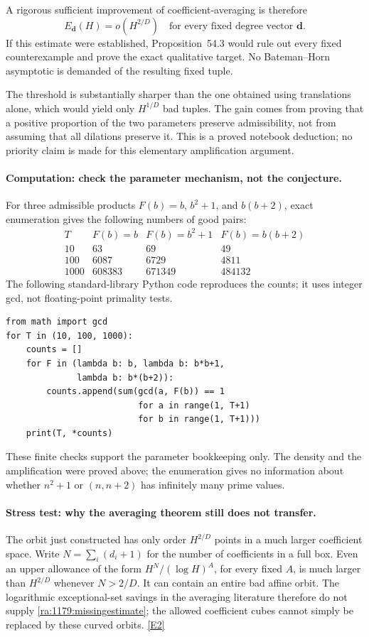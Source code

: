 \documentclass[11pt]{article}
\newcommand{\eref}[2]{\hyperlink{extra:#1:#2}{[E#2]}}
\begin{document}
A rigorous sufficient improvement of coefficient-averaging is therefore
\begin{equation}\label{ra:1179:missingestimate}
 \boxed{\quad E_{\mathbf d}(H)=o(H^{2/D})
 \quad\text{for every fixed degree vector }\mathbf d.\quad}
\end{equation}
If this estimate were established, Proposition~54.3 would rule out every
fixed counterexample and prove the exact qualitative target. No
Bateman--Horn asymptotic is demanded of the resulting fixed tuple.

The threshold is substantially sharper than the one obtained using
translations alone, which would yield only $H^{1/D}$ bad tuples.
The gain comes from proving that a positive proportion of the two
parameters preserve admissibility, not from assuming that all dilations
preserve it. This is a proved notebook deduction; no priority claim is
made for this elementary amplification argument.

\paragraph{Computation: check the parameter mechanism, not the conjecture.}
For three admissible products $F(b)=b$, $b^2+1$, and $b(b+2)$,
exact enumeration gives the following numbers of good pairs:
\[
\begin{array}{c|rrr}
 T & F(b)=b & F(b)=b^2+1 & F(b)=b(b+2)\\\hline
 10&63&69&49\\
 100&6087&6729&4811\\
 1000&608383&671349&484132
\end{array}
\]
The following standard-library Python code reproduces the counts; it
uses integer gcd, not floating-point primality tests.
\begin{verbatim}
from math import gcd
for T in (10, 100, 1000):
    counts = []
    for F in (lambda b: b, lambda b: b*b+1,
              lambda b: b*(b+2)):
        counts.append(sum(gcd(a, F(b)) == 1
                          for a in range(1, T+1)
                          for b in range(1, T+1)))
    print(T, *counts)
\end{verbatim}
These finite checks support the parameter bookkeeping only. The density
and the amplification were proved above; the enumeration gives no
information about whether $n^2+1$ or $(n,n+2)$ has infinitely many prime
values.

\paragraph{Stress test: why the averaging theorem still does not transfer.}
The orbit just constructed has only order $H^{2/D}$ points in a much
larger coefficient space. Write $N=\sum_i(d_i+1)$ for the number of
coefficients in a full box. Even an upper allowance of the form
$H^N/(\log H)^A$, for every fixed $A$, is much larger than
$H^{2/D}$ whenever $N>2/D$. It can contain an entire bad affine orbit.
The logarithmic exceptional-set savings in the averaging literature
therefore do not supply \eqref{ra:1179:missingestimate}; the allowed
coefficient cubes cannot simply be replaced by these curved orbits.
\eref{1179}{2}
\end{document}
